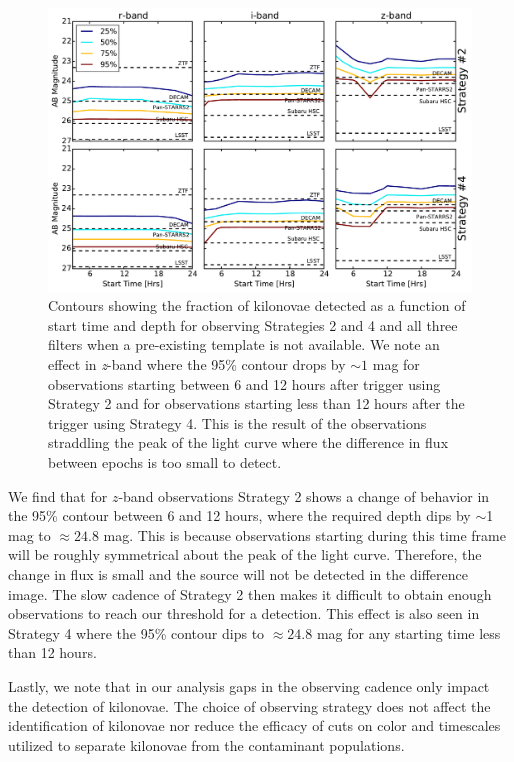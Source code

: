 \begin{figure}[t!]
\centering
\includegraphics[width=\textwidth]{./figs/chapter2/f19.pdf}
\caption{\singlespace Contours showing the fraction of kilonovae detected as a function of start time and depth for observing Strategies 2 and 4 and all three filters when a pre-existing template is not available. We note an effect in {\em z}-band where the 95\% contour drops by $\sim1$ mag for observations starting between 6 and 12 hours after trigger using Strategy 2 and for observations starting less than 12 hours after the trigger using Strategy 4. This is the result of the observations straddling the peak of the light curve where the difference in flux between epochs is too small to detect.}
\label{fig:ch2_detdiff_24}
\end{figure}

\clearpage
We find that for $z$-band observations Strategy 2 shows a change of behavior in the 95\% contour between 6 and 12 hours, where the required depth dips by $\sim$1 mag to $\approx 24.8$ mag. This is because observations starting during this time frame will be roughly symmetrical about the peak of the light curve. Therefore, the change in flux is small and the source will not be detected in the difference image. The slow cadence of Strategy 2 then makes it difficult to obtain enough observations to reach our threshold for a detection. This effect is also seen in Strategy 4 where the 95\% contour dips to $\approx 24.8$ mag for any starting time less than 12 hours.

Lastly, we note that in our analysis gaps in the observing cadence only impact the detection of kilonovae. The choice of observing strategy does not affect the identification of kilonovae nor reduce the efficacy of cuts on color and timescales utilized to separate kilonovae from the contaminant populations.

